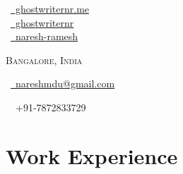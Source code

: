 \documentclass[a4paper,10pt]{extarticle} %
\begin{document}
\pagestyle{empty} %


\begin{multicols}{3}
\normalsize  \faGlobe\ {\href{https://ghostwriternr.me/}{\  ghostwriternr.me}}\\
\normalsize \faGithub\ {\href{https://github.com/ghostwriternr}{\  ghostwriternr}}\\
\normalsize  \faLinkedinSquare\ {\href{https://www.linkedin.com/in/naresh-ramesh}{\  naresh-ramesh}}\\
\columnbreak
\normalsize\par{\par} %
\par{\centering\normalsize{\textsc{Bangalore, India\\}}\hfill\par}
\columnbreak
\raggedright\hfill\normalsize \faEnvelope\ {\href{mailto:nareshmdu@gmail.com}{\  nareshmdu@gmail.com}}\\
\raggedright\hfill{\faPhone\ \  +91-7872833729}
\end{multicols}


\vspace{-0.7cm}
\section{\textcolor{primary}{Work Experience}}
\end{document}

